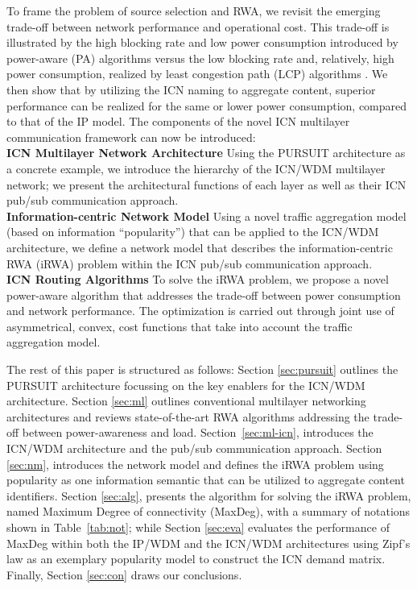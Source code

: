 \documentclass[journal]{IEEEtran}
\begin{document}
To frame the problem of source selection and RWA, we revisit the
emerging trade-off between network performance and operational
cost. This trade-off is illustrated by the high blocking rate and low
power consumption introduced by power-aware (PA) algorithms versus the
low blocking rate and, relatively, high power consumption, realized by least congestion path (LCP) algorithms \cite{wia:alloptic, coi:alloptic}.
We then show that by utilizing the ICN naming to aggregate content, superior performance can be realized for the same or lower power consumption, compared to that of the IP model.
The components of the novel ICN multilayer communication framework can now be introduced:\\
\textbf{ICN Multilayer Network Architecture} Using the PURSUIT architecture as a concrete example, we introduce the hierarchy of the ICN/WDM multilayer network; we present the architectural functions of each layer as well as their ICN pub/sub communication approach.\\
\textbf{Information-centric Network Model} Using a novel traffic aggregation model (based on information ``popularity'') that can be applied to the ICN/WDM architecture, we define a network model that describes the information-centric RWA (iRWA) problem within the ICN pub/sub communication approach.\\
\textbf{ICN Routing Algorithms} To solve the iRWA problem, we propose a novel power-aware algorithm that addresses the trade-off between power consumption and network performance. The optimization is carried out through joint use of asymmetrical, convex, cost functions that take into account the traffic aggregation model.

The rest of this paper is structured as follows: Section
\ref{sec:pursuit} outlines the PURSUIT architecture focussing on the key enablers for the ICN/WDM architecture. Section \ref{sec:ml} outlines conventional multilayer networking architectures and reviews state-of-the-art RWA algorithms addressing the trade-off between power-awareness and load. Section~\ref{sec:ml-icn}, introduces the ICN/WDM architecture and the pub/sub communication approach. Section \ref{sec:nm}, introduces the network model and defines the iRWA problem using popularity as one information semantic that can be utilized to aggregate content identifiers. Section \ref{sec:alg}, presents the algorithm for solving the iRWA problem, named Maximum Degree of connectivity (MaxDeg), with a summary of notations shown in Table~\ref{tab:not}; while Section \ref{sec:eva} evaluates the performance of MaxDeg within both the IP/WDM and the ICN/WDM architectures using Zipf's law as an exemplary popularity model to construct the ICN demand matrix. Finally, Section \ref{sec:con} draws our conclusions.
\end{document}
